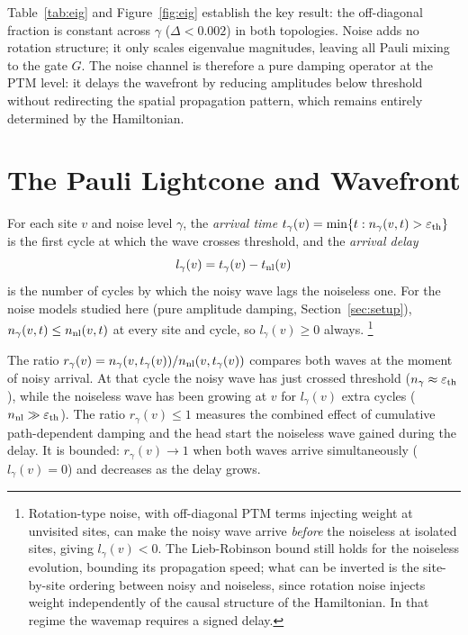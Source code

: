 \documentclass[12pt]{article}
\begin{document}
Table~\ref{tab:eig} and Figure~\ref{fig:eig} establish the key result: the off-diagonal fraction is
constant across $\gamma$ ($\Delta < 0.002$) in both topologies.
Noise adds no rotation structure; it only scales eigenvalue magnitudes,
leaving all Pauli mixing to the gate $G$.
The noise channel is therefore a pure damping operator at the PTM level:
it delays the wavefront by reducing amplitudes below threshold without
redirecting the spatial propagation pattern, which remains entirely
determined by the Hamiltonian.

\section{The Pauli Lightcone and Wavefront}
\label{sec:observables}

For each site $v$ and noise level $\gamma$, the \emph{arrival time}
$t_\gamma(v) = \min\{t : n_\gamma(v,t) > \varepsilon_{\rm th}\}$
is the first cycle at which the wave crosses threshold,
and the \emph{arrival delay}
\begin{equation}
    l_\gamma(v) = t_\gamma(v) - t_{\rm nl}(v)
    \label{eq:delay}
\end{equation}
is the number of cycles by which the noisy wave lags the noiseless one.
For the noise models studied here (pure amplitude damping, Section~\ref{sec:setup}),
$n_\gamma(v,t) \leq n_{\rm nl}(v,t)$ at every site and cycle, so $l_\gamma(v) \geq 0$ always.%
\footnote{Rotation-type noise, with off-diagonal PTM terms injecting weight at
unvisited sites, can make the noisy wave arrive \emph{before} the noiseless at
isolated sites, giving $l_\gamma(v) < 0$. The Lieb-Robinson bound still holds
for the noiseless evolution, bounding its propagation speed; what can be inverted
is the site-by-site ordering between noisy and noiseless, since rotation noise
injects weight independently of the causal structure of the Hamiltonian.
In that regime the wavemap requires a signed delay.}

The ratio $r_\gamma(v) = n_\gamma(v, t_\gamma(v)) / n_{\rm nl}(v, t_\gamma(v))$
compares both waves at the moment of noisy arrival.
At that cycle the noisy wave has just crossed threshold
($n_\gamma \approx \varepsilon_{\rm th}$), while the noiseless wave has been
growing at $v$ for $l_\gamma(v)$ extra cycles
($n_{\rm nl} \gg \varepsilon_{\rm th}$).
The ratio $r_\gamma(v) \leq 1$ measures the combined effect of cumulative
path-dependent damping and the head start the noiseless wave gained during
the delay. It is bounded: $r_\gamma(v) \to 1$ when both waves arrive
simultaneously ($l_\gamma(v) = 0$) and decreases as the delay grows.
\end{document}

